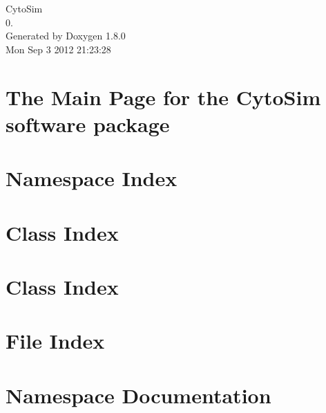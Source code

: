 \documentclass{book}
\begin{document}
\hypersetup{pageanchor=false,citecolor=blue}
\begin{titlepage}
\vspace*{7cm}
\begin{center}
{\Large Cyto\-Sim \\[1ex]\large 0. }\\
\vspace*{1cm}
{\large Generated by Doxygen 1.8.0}\\
\vspace*{0.5cm}
{\small Mon Sep 3 2012 21:23:28}\\
\end{center}
\end{titlepage}
\clearemptydoublepage
{}
\tableofcontents
\clearemptydoublepage
{}
\hypersetup{pageanchor=true,citecolor=blue}
\chapter{The Main Page for the Cyto\-Sim software package}
\label{index}\hypertarget{index}{}
\chapter{Namespace Index}

\chapter{Class Index}

\chapter{Class Index}

\chapter{File Index}

\chapter{Namespace Documentation}

\end{document}
